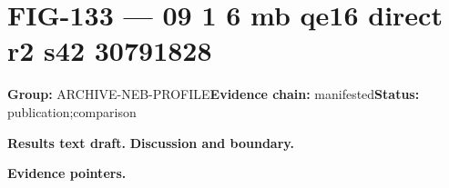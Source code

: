 \clearpage
\section{FIG-133 --- 09 1 6 mb qe16 direct r2 s42 30791828}
\label{figpage:fig-133}
\textbf{Group:} ARCHIVE-NEB-PROFILE\quad \textbf{Evidence chain:} manifested\quad \textbf{Status:} publication;comparison

\textbf{Results text draft.} 
\textbf{Discussion and boundary.} 


\textbf{Evidence pointers.}



\vfill
